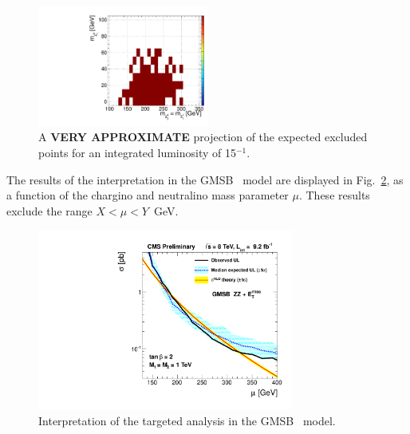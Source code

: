 \clearpage

\begin{figure}[!ht]
\begin{center}
\includegraphics[width=0.5\textwidth]{plots/wzsms_expected_15fb.pdf}
\caption{ A {\bf VERY APPROXIMATE} projection of the expected excluded points for an integrated luminosity of 15$^{-1}$. 
\label{fig:results_15fb}}
\end{center}
\end{figure}

The results of the interpretation in the GMSB \zzmet\ model are displayed in Fig.~\ref{fig:results_gmsb},
as a function of the chargino and neutralino mass parameter $\mu$. These results exclude the range $X < \mu < Y$~GeV.

\begin{figure}[!hb]
\begin{center}
\includegraphics[width=0.75\textwidth]{plots/ZDIJET_GMSB.pdf}
\caption{ Interpretation of the targeted analysis in the GMSB \zzmet\ model.
\label{fig:results_gmsb}}
\end{center}
\end{figure}
